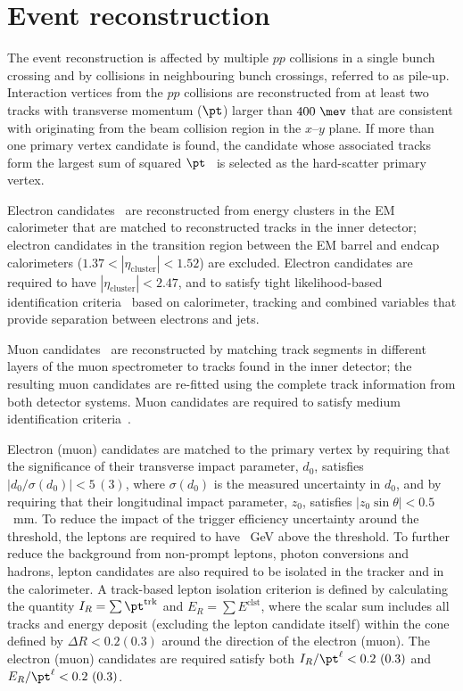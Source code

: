 \section{Event reconstruction}
\label{sec:objects}

The event reconstruction is affected by multiple $pp$ collisions in a single bunch crossing and by collisions
in neighbouring bunch crossings, referred to as pile-up. 
Interaction vertices from the $pp$ collisions are reconstructed from at least two tracks 
with transverse momentum ($\pt$) larger than $400~\mev$ that are consistent with originating from the 
beam collision region in the $x$--$y$ plane. If more than one primary vertex candidate is found, the
candidate whose associated tracks form the largest sum of squared $\pt$~\cite{ATL-PHYS-PUB-2015-026}
is selected as the hard-scatter primary vertex.

Electron candidates~\cite{ATLAS-CONF-2016-024,Aaboud:2018ugz} are reconstructed from energy 
clusters in the EM calorimeter that are matched to reconstructed tracks in the inner detector;
electron candidates in the transition region between the EM barrel and endcap calorimeters 
($1.37 < |\eta_{\textrm{cluster}}| < 1.52$) are excluded.
Electron candidates are required to have $|\eta_{\textrm{cluster}}| < 2.47$, and to satisfy tight likelihood-based identification 
criteria~\cite{ATLAS-CONF-2016-024} based on calorimeter, tracking and combined variables that provide 
separation between electrons and jets. 

Muon candidates~\cite{Aad:2016jkr} are reconstructed by matching track segments in %
different layers of the muon spectrometer to tracks found in the inner detector;
the resulting muon candidates are re-fitted using the complete track information from both detector systems.
Muon candidates are required to satisfy medium identification criteria~\cite{Aad:2016jkr}. 

Electron (muon) candidates are matched to the primary vertex by requiring that the significance of their transverse impact parameter, $d_0$, 
satisfies $|d_0/\sigma(d_0)|<5\,(3)$, where $\sigma(d_0)$ is the measured uncertainty in $d_0$,
and by requiring that their longitudinal impact parameter, $z_0$, satisfies $|z_0 \sin\theta|<0.5$~mm. To reduce the impact of the trigger efficiency uncertainty around the threshold, the leptons are required to have ~GeV above the threshold.
To further reduce the background from non-prompt leptons, photon conversions and hadrons, lepton candidates are also required to be isolated 
in the tracker and in the calorimeter.
A track-based lepton isolation criterion is defined by calculating the quantity $I_R = \sum \pt^{\textrm{trk}}$ and $E_R = \sum E^{\textrm{clst}}$, where
the scalar sum includes all tracks and energy deposit (excluding the lepton candidate itself) within the cone defined by $\Delta R<0.2 (0.3)$ around the %
direction of the electron (muon). The electron (muon) candidates are required satisfy both $I_R/\pt^\ell < 0.2~(0.3)$ and $E_R/\pt^\ell < 0.2~(0.3)$.

